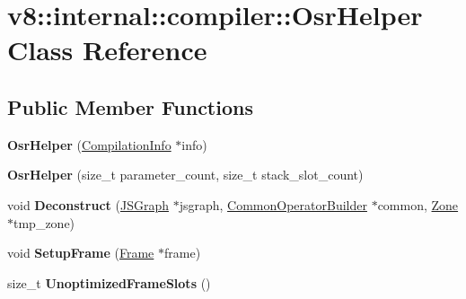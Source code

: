 \hypertarget{classv8_1_1internal_1_1compiler_1_1_osr_helper}{}\section{v8\+:\+:internal\+:\+:compiler\+:\+:Osr\+Helper Class Reference}
\label{classv8_1_1internal_1_1compiler_1_1_osr_helper}
\subsection*{Public Member Functions}
\begin{DoxyCompactItemize}
\item 
{\bfseries Osr\+Helper} (\hyperlink{classv8_1_1internal_1_1_compilation_info}{Compilation\+Info} $\ast$info)\hypertarget{classv8_1_1internal_1_1compiler_1_1_osr_helper_a9067333a3c635cba79dae9d9997c6d24}{}\label{classv8_1_1internal_1_1compiler_1_1_osr_helper_a9067333a3c635cba79dae9d9997c6d24}

\item 
{\bfseries Osr\+Helper} (size\+\_\+t parameter\+\_\+count, size\+\_\+t stack\+\_\+slot\+\_\+count)\hypertarget{classv8_1_1internal_1_1compiler_1_1_osr_helper_a9381573d8f04e1bb6504c4ba45b98a50}{}\label{classv8_1_1internal_1_1compiler_1_1_osr_helper_a9381573d8f04e1bb6504c4ba45b98a50}

\item 
void {\bfseries Deconstruct} (\hyperlink{classv8_1_1internal_1_1compiler_1_1_j_s_graph}{J\+S\+Graph} $\ast$jsgraph, \hyperlink{classv8_1_1internal_1_1compiler_1_1_common_operator_builder}{Common\+Operator\+Builder} $\ast$common, \hyperlink{classv8_1_1internal_1_1_zone}{Zone} $\ast$tmp\+\_\+zone)\hypertarget{classv8_1_1internal_1_1compiler_1_1_osr_helper_a5ab11e18f50c377feb8d300287c86bd2}{}\label{classv8_1_1internal_1_1compiler_1_1_osr_helper_a5ab11e18f50c377feb8d300287c86bd2}

\item 
void {\bfseries Setup\+Frame} (\hyperlink{classv8_1_1internal_1_1compiler_1_1_frame}{Frame} $\ast$frame)\hypertarget{classv8_1_1internal_1_1compiler_1_1_osr_helper_a5061cacc2fb9df08e51206958fd0fafc}{}\label{classv8_1_1internal_1_1compiler_1_1_osr_helper_a5061cacc2fb9df08e51206958fd0fafc}

\item 
size\+\_\+t {\bfseries Unoptimized\+Frame\+Slots} ()\hypertarget{classv8_1_1internal_1_1compiler_1_1_osr_helper_ad13873aecfcfbff35799cab4b4e0df92}{}\label{classv8_1_1internal_1_1compiler_1_1_osr_helper_ad13873aecfcfbff35799cab4b4e0df92}

\end{DoxyCompactItemize}
